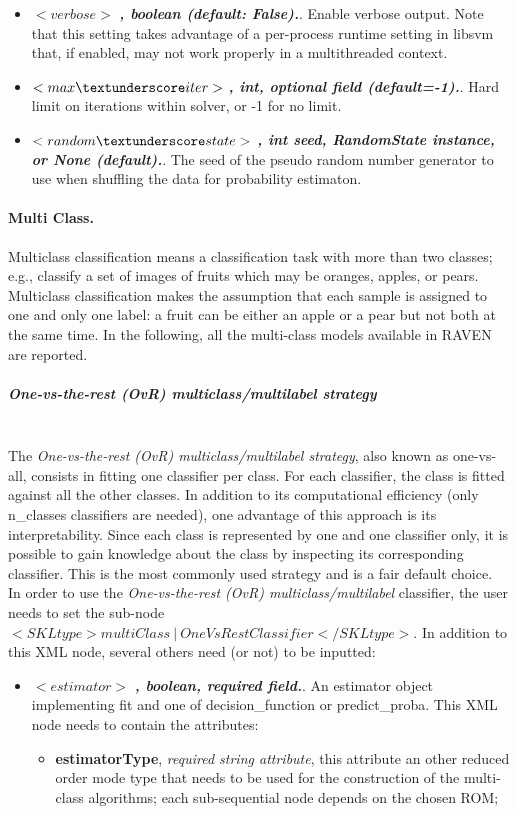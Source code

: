 \begin{itemize}
  \item $<verbose>$ \textbf{\textit{, boolean (default: False).}}. Enable verbose output. Note that this setting takes advantage of a per-process runtime setting in libsvm that, if enabled, may not work properly in a multithreaded context.
  \item $<max\textunderscore iter>$ \textbf{\textit{, int, optional field (default=-1).}}. Hard limit on iterations within solver, or -1 for no limit.
  \item $<random\textunderscore state>$ \textbf{\textit{, int seed, RandomState instance, or None (default).}}. The seed of the pseudo random number generator to use when shuffling the data for probability estimaton.
\end{itemize}
\paragraph{Multi Class.}
\label{Multiclass}
Multiclass classification means a classification task with more than two classes; e.g., classify a set of images of fruits which may be oranges, apples, or pears. Multiclass classification makes the assumption that each sample is assigned to one and only one label: a fruit can be either an apple or a pear but not both at the same time.
In the following, all the multi-class models available in RAVEN are reported.
\subparagraph{One-vs-the-rest (OvR) multiclass/multilabel strategy}
\mbox{}
\\The \textit{One-vs-the-rest (OvR) multiclass/multilabel strategy}, also known as one-vs-all, consists in fitting one classifier per class. For each classifier, the class is fitted against all the other classes. In addition to its computational efficiency (only n\_classes classifiers are needed), one advantage of this approach is its interpretability. Since each class is represented by one and one classifier only, it is possible to gain knowledge about the class by inspecting its corresponding classifier. This is the most commonly used strategy and is a fair default choice.
\\In order to use the  \textit{One-vs-the-rest (OvR) multiclass/multilabel} classifier, the user needs to set the sub-node $<SKLtype>multiClass~\vert~OneVsRestClassifier</SKLtype>$. In addition to this XML node, several others need (or not) to be inputted:
\begin{itemize}
\item $<estimator>$ \textbf{\textit{, boolean, required field.}}.  An estimator object implementing fit and one of decision\_function or predict\_proba. This XML node needs to contain the attributes:
\vspace{-5mm}
\begin{itemize}
\itemsep0em
\item \textbf{estimatorType}, \textit{required string attribute}, this attribute an other reduced order mode type that needs to be used for the construction of the multi-class algorithms; each sub-sequential node depends on the chosen ROM;
\end{itemize}
\end{itemize}

